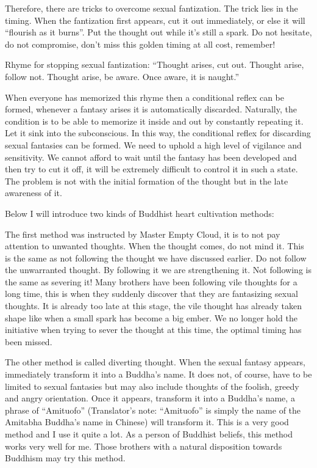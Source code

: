 \documentclass[
]{book}
\begin{document}
Therefore, there are tricks to overcome sexual fantization. The trick lies in the timing. When the fantization first appears, cut it out immediately, or else it will ``flourish as it burns''. Put the thought out while it's still a spark. Do not hesitate, do not compromise, don't miss this golden timing at all cost, remember!

Rhyme for stopping sexual fantization: ``Thought arises, cut out. Thought arise, follow not. Thought arise, be aware. Once aware, it is naught.''

When everyone has memorized this rhyme then a conditional reflex can be formed, whenever a fantasy arises it is automatically discarded. Naturally, the condition is to be able to memorize it inside and out by constantly repeating it. Let it sink into the subconscious. In this way, the conditional reflex for discarding sexual fantasies can be formed. We need to uphold a high level of vigilance and sensitivity. We cannot afford to wait until the fantasy has been developed and then try to cut it off, it will be extremely difficult to control it in such a state. The problem is not with the initial formation of the thought but in the late awareness of it.

Below I will introduce two kinds of Buddhist heart cultivation methods:

The first method was instructed by Master Empty Cloud, it is to not pay attention to unwanted thoughts. When the thought comes, do not mind it. This is the same as not following the thought we have discussed earlier. Do not follow the unwarranted thought. By following it we are strengthening it. Not following is the same as severing it! Many brothers have been following vile thoughts for a long time, this is when they suddenly discover that they are fantasizing sexual thoughts. It is already too late at this stage, the vile thought has already taken shape like when a small spark has become a big ember. We no longer hold the initiative when trying to sever the thought at this time, the optimal timing has been missed.

The other method is called diverting thought. When the sexual fantasy appears, immediately transform it into a Buddha's name. It does not, of course, have to be limited to sexual fantasies but may also include thoughts of the foolish, greedy and angry orientation. Once it appears, transform it into a Buddha's name, a phrase of ``Amituofo'' (Translator's note: ``Amituofo'' is simply the name of the Amitabha Buddha's name in Chinese) will transform it. This is a very good method and I use it quite a lot. As a person of Buddhist beliefs, this method works very well for me. Those brothers with a natural disposition towards Buddhism may try this method.
\end{document}
